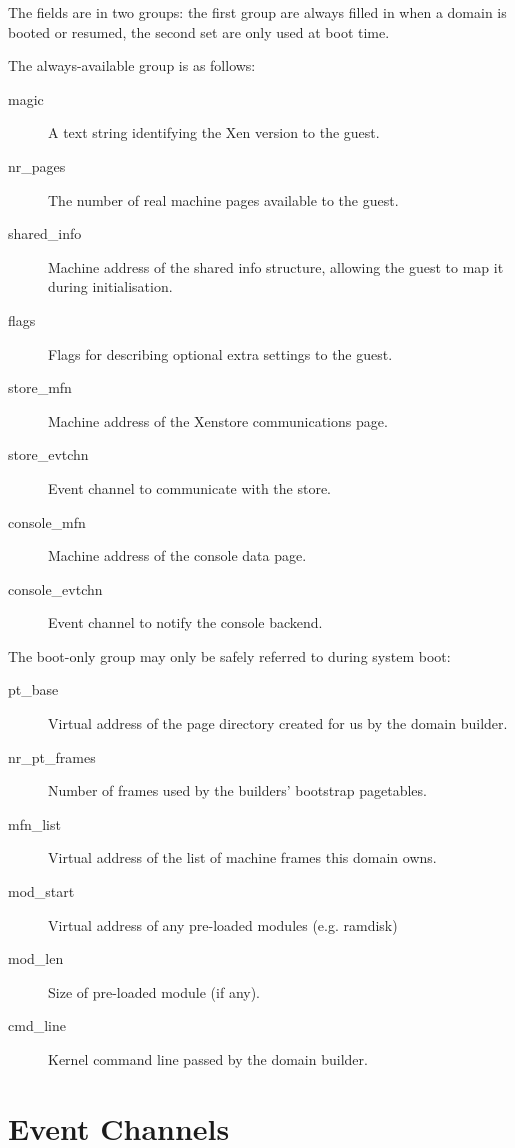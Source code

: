 \documentclass[11pt,twoside,final,openright]{report}
\begin{document}
The fields are in two groups: the first group are always filled in
when a domain is booted or resumed, the second set are only used at
boot time.

The always-available group is as follows:

\begin{description}
\item[magic] A text string identifying the Xen version to the guest.
\item[nr\_pages] The number of real machine pages available to the
  guest.
\item[shared\_info] Machine address of the shared info structure,
  allowing the guest to map it during initialisation.
\item[flags] Flags for describing optional extra settings to the
  guest.
\item[store\_mfn] Machine address of the Xenstore communications page.
\item[store\_evtchn] Event channel to communicate with the store.
\item[console\_mfn] Machine address of the console data page.
\item[console\_evtchn] Event channel to notify the console backend.
\end{description}

The boot-only group may only be safely referred to during system boot:

\begin{description}
\item[pt\_base] Virtual address of the page directory created for us
  by the domain builder.
\item[nr\_pt\_frames] Number of frames used by the builders' bootstrap
  pagetables.
\item[mfn\_list] Virtual address of the list of machine frames this
  domain owns.
\item[mod\_start] Virtual address of any pre-loaded modules
  (e.g. ramdisk)
\item[mod\_len] Size of pre-loaded module (if any).
\item[cmd\_line] Kernel command line passed by the domain builder.
\end{description}



\chapter{Event Channels}
\label{c:eventchannels}
\end{document}
